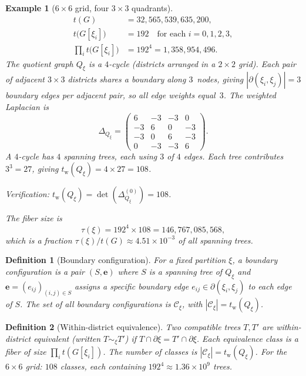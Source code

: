 \documentclass[11pt]{article}
\newtheorem{definition}{Definition}[section]
\newtheorem{example}{Example}[section]
\newcommand{\tw}{t_{\mathrm{w}}}
\begin{document}
\begin{example}[$6 \times 6$ grid, four $3 \times 3$ quadrants]\label{ex:6x6}
\begin{align*}
  t(G) &= 32{,}565{,}539{,}635{,}200, \\
  t\bigl(G[\xi_i]\bigr) &= 192 \quad \text{for each } i = 0,1,2,3, \\
  \prod_i t\bigl(G[\xi_i]\bigr) &= 192^4 = 1{,}358{,}954{,}496.
\end{align*}
The quotient graph $Q_{\xi}$ is a $4$-cycle (districts arranged in a $2 \times 2$
grid). Each pair of adjacent $3 \times 3$ districts shares a boundary along
$3$~nodes, giving $|\partial(\xi_i, \xi_j)| = 3$ boundary edges per adjacent
pair, so all edge weights equal~$3$. The weighted Laplacian is
\[
  \Delta_{Q_{\xi}} =
  \begin{pmatrix}
     6 & -3 & -3 &  0 \\
    -3 &  6 &  0 & -3 \\
    -3 &  0 &  6 & -3 \\
     0 & -3 & -3 &  6
  \end{pmatrix}.
\]
A $4$-cycle has $4$ spanning trees, each using $3$ of $4$ edges. Each tree
contributes $3^3 = 27$, giving $\tw(Q_{\xi}) = 4 \times 27 = 108$.

Verification: $\tw(Q_{\xi}) = \det(\Delta_{Q_{\xi}}^{(0)}) = 108$. \checkmark

The fiber size is
\[
  \tau(\xi) = 192^4 \times 108 = 146{,}767{,}085{,}568,
\]
which is a fraction $\tau(\xi)/t(G) \approx 4.51 \times 10^{-3}$ of all spanning trees.
\end{example}


\begin{definition}[Boundary configuration]\label{def:boundary-config}
For a fixed partition $\xi$, a \emph{boundary configuration} is a pair
$(S, \mathbf{e})$ where $S$ is a spanning tree of $Q_{\xi}$ and
$\mathbf{e} = (e_{ij})_{(i,j) \in S}$ assigns a specific boundary edge
$e_{ij} \in \partial(\xi_i, \xi_j)$ to each edge of $S$.
The set of all boundary configurations is $\mathcal{C}_{\xi}$, with
$|\mathcal{C}_{\xi}| = \tw(Q_{\xi})$.
\end{definition}

\begin{definition}[Within-district equivalence]\label{def:wd-equiv}
Two compatible trees $T, T'$ are \emph{within-district equivalent}
(written $T \sim_{\xi} T'$) if $T \cap \partial\xi = T' \cap \partial\xi$.
Each equivalence class is a \emph{fiber} of size $\prod_i t(G[\xi_i])$.
The number of classes is $|\mathcal{C}_{\xi}| = \tw(Q_{\xi})$.
For the $6 \times 6$ grid: $108$ classes, each containing
$192^4 \approx 1.36 \times 10^9$ trees.
\end{definition}
\end{document}

